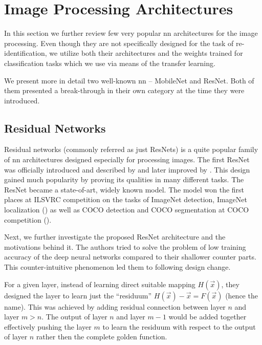 \section{Image Processing Architectures}

\label{sec:existing_architectures}

In this section we further review few very popular \gls{nn} architectures
for the image processing. Even though they are not specifically designed for the
task of re-identification, we utilize both their architectures and the 
weights trained for classification tasks which we use via means of
the transfer learning.

We present more in detail two well-known \gls{nn} -- MobileNet and ResNet.
Both of them presented a break-through in their own category at the time they were introduced.

\subsection{Residual Networks}

\label{ssec:resnet}

Residual networks (commonly referred as just ResNets) is a quite popular family
of \gls{nn} architectures designed especially for processing images. The first ResNet was
officially introduced and described by \cite{resnet} and later improved by
\cite{resnetimp}. This design gained much popularity by proving its qualities in many different tasks.
The ResNet became a state-of-art, widely known model. The model won the first places at ILSVRC competition on the
tasks of ImageNet detection, ImageNet localization (\cite{imagenetresults}) as
well as COCO detection and COCO segmentation at COCO competition
(\cite{cocodataset}).

Next, we further investigate the proposed ResNet architecture and the
motivations behind it. The authors tried to solve the problem of low training
accuracy of the deep neural networks compared to their shallower counter parts.
This counter-intuitive phenomenon led them to following design change.

For a given layer, instead of learning direct suitable mapping $H(\vec{x})$,
they designed the layer to learn just the ``residuum''
$H(\vec{x}) - \vec{x} = F(\vec{x})$ (hence the name). This was achieved by
adding residual connection between layer $n$ and layer $m > n$.
The output of layer $n$ and layer $m - 1$ would be added
together effectively pushing the layer $m$ to learn the residuum with respect to
the output of layer $n$ rather then the complete golden function.

